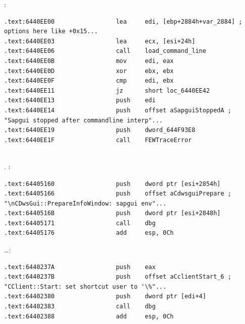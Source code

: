 :

\begin{lstlisting}
.text:6440EE00                 lea     edi, [ebp+2884h+var_2884] ; options here like +0x15...
.text:6440EE03                 lea     ecx, [esi+24h]
.text:6440EE06                 call    load_command_line
.text:6440EE0B                 mov     edi, eax
.text:6440EE0D                 xor     ebx, ebx
.text:6440EE0F                 cmp     edi, ebx
.text:6440EE11                 jz      short loc_6440EE42
.text:6440EE13                 push    edi
.text:6440EE14                 push    offset aSapguiStoppedA ; "Sapgui stopped after commandline interp"...
.text:6440EE19                 push    dword_644F93E8
.text:6440EE1F                 call    FEWTraceError
\end{lstlisting}

\ESph{}\PTBRph{}\PLph{} \\
.
%
:

\begin{lstlisting}
.text:64405160                 push    dword ptr [esi+2854h]
.text:64405166                 push    offset aCdwsguiPrepare ; "\nCDwsGui::PrepareInfoWindow: sapgui env"...
.text:6440516B                 push    dword ptr [esi+2848h]
.text:64405171                 call    dbg
.text:64405176                 add     esp, 0Ch
\end{lstlisting}

\dots \OrENRU:

\begin{lstlisting}
.text:6440237A                 push    eax
.text:6440237B                 push    offset aCclientStart_6 ; "CClient::Start: set shortcut user to '\%"...
.text:64402380                 push    dword ptr [edi+4]
.text:64402383                 call    dbg
.text:64402388                 add     esp, 0Ch
\end{lstlisting}

